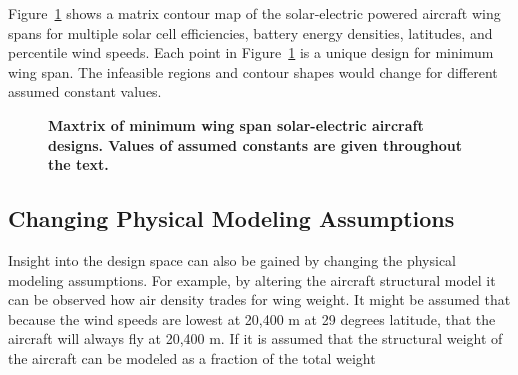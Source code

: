 Figure~\ref{f:solarcontours} shows a matrix contour map of the solar-electric powered aircraft wing spans for multiple solar cell efficiencies, battery energy densities, latitudes, and percentile wind speeds.
Each point in Figure~\ref{f:solarcontours} is a unique design for minimum wing span. 
The infeasible regions and contour shapes would change for different assumed constant values. 

 \begin{figure}[H]
 \begin{subfigmatrix}{3}%
 \end{subfigmatrix}
 \caption{\textbf{Maxtrix of minimum wing span solar-electric aircraft designs. Values of assumed constants are given throughout the text.}}
 \label{f:solarcontours}
\end{figure}

\subsection{Changing Physical Modeling Assumptions}

Insight into the design space can also be gained by changing the physical modeling assumptions.
For example, by altering the aircraft structural model it can be observed how air density trades for wing weight. 
It might be assumed that because the wind speeds are lowest at 20,400 m at 29 degrees latitude, that the aircraft will always fly at 20,400 m.  
If it is assumed that the structural weight of the aircraft can be modeled as a fraction of the total weight 

